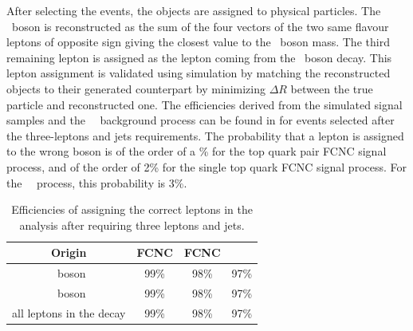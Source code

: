 %
After selecting the events,  the objects are assigned to physical particles.  The \PZ\ boson is reconstructed as the sum of the four vectors of the two same flavour leptons of opposite sign giving the closest value to the \PZ\ boson mass. The third remaining lepton is assigned as the lepton coming from the \PW\ boson decay. This lepton assignment is  validated using simulation by matching the reconstructed objects to their generated counterpart by minimizing $\Delta R$ between the true particle and reconstructed one. The efficiencies derived from the simulated signal samples and the \SM\ \tZq\ background process can be found in  for events selected after the three-leptons and jets requirements. The probability that a lepton is assigned to the wrong boson is of the order of a \% for the top quark pair FCNC signal process, and of the order of 2\% for the single top quark FCNC signal process. For the \SM\ \tZq\ process, this probability is 3\%.
\begin{table}[htbp]
	\centering
	\caption{Efficiencies of assigning the correct leptons in the analysis after requiring three leptons and jets.}
	\begin{tabular}{cccc}
		\toprule 
		Origin & FCNC \tZq  & FCNC \tZ & \SM\ \tZq \\ 
		\midrule
		\PW\ boson & 99\% & 98\% & 97\% \\ 
	
		\PZ\ boson  & 99\% & 98\% & 97\% \B\\ 
		 \hdashline
		all leptons in the decay & 99\% & 98\% & 97\% \T \\ 
		\bottomrule
	\end{tabular} 
	\label{tab:matching}
\end{table}

